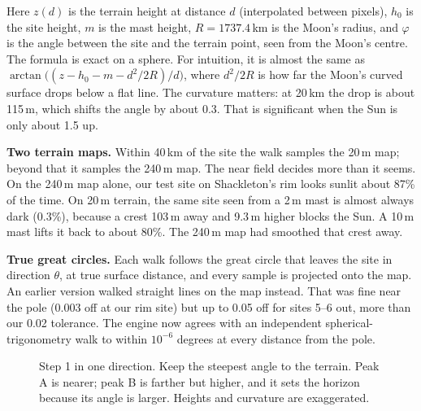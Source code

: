 \documentclass[11pt,a4paper]{article}
\begin{document}
Here $z(d)$ is the terrain height at distance $d$ (interpolated between pixels), $h_0$ is the site height, $m$ is the mast height, $R = 1737.4$\,km is the Moon's radius, and $\varphi$ is the angle between the site and the terrain point, seen from the Moon's centre. The formula is exact on a sphere. For intuition, it is almost the same as $\arctan\!\big((z - h_0 - m - d^2/2R)/d\big)$, where $d^2/2R$ is how far the Moon's curved surface drops below a flat line. The curvature matters: at 20\,km the drop is about 115\,m, which shifts the angle by about 0.3\textdegree. That is significant when the Sun is only about 1.5\textdegree{} up.

\textbf{Two terrain maps.} Within 40\,km of the site the walk samples the 20\,m map; beyond that it samples the 240\,m map. The near field decides more than it seems. On the 240\,m map alone, our test site on Shackleton's rim looks sunlit about 87\% of the time. On 20\,m terrain, the same site seen from a 2\,m mast is almost always dark (0.3\%), because a crest 103\,m away and 9.3\,m higher blocks the Sun. A 10\,m mast lifts it back to about 80\%. The 240\,m map had smoothed that crest away.

\textbf{True great circles.} Each walk follows the great circle that leaves the site in direction $\theta$, at true surface distance, and every sample is projected onto the map. An earlier version walked straight lines on the map instead. That was fine near the pole (0.003\textdegree{} off at our rim site) but up to 0.05\textdegree{} off for sites 5--6\textdegree{} out, more than our 0.02\textdegree{} tolerance. The engine now agrees with an independent spherical-trigonometry walk to within $10^{-6}$ degrees at every distance from the pole.

\begin{figure}[ht]
\centering
{}
\caption{Step 1 in one direction. Keep the steepest angle to the terrain. Peak A is nearer; peak B is farther but higher, and it sets the horizon because its angle is larger. Heights and curvature are exaggerated.}
\label{fig:cross}
\end{figure}
\end{document}
